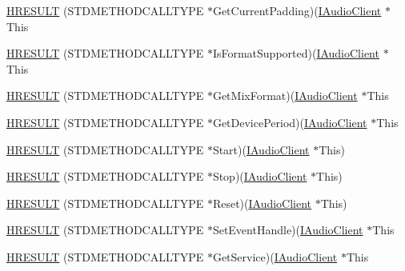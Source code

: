 \begin{DoxyCompactItemize}
\hyperlink{struct_i_audio_client_vtbl_a0fdf15db0d74b0e4052f2410f59a59ce}{H\+R\+E\+S\+U\+LT} (S\+T\+D\+M\+E\+T\+H\+O\+D\+C\+A\+L\+L\+T\+Y\+PE $\ast$Get\+Current\+Padding)(\hyperlink{audioclient_8h_ace13012ab56d9326b7aabeab5d477652}{I\+Audio\+Client} $\ast$This
\item 
\hyperlink{struct_i_audio_client_vtbl_a64bb7eb33a2fa4dbf465bf67ac32dfcc}{H\+R\+E\+S\+U\+LT} (S\+T\+D\+M\+E\+T\+H\+O\+D\+C\+A\+L\+L\+T\+Y\+PE $\ast$Is\+Format\+Supported)(\hyperlink{audioclient_8h_ace13012ab56d9326b7aabeab5d477652}{I\+Audio\+Client} $\ast$This
\item 
\hyperlink{struct_i_audio_client_vtbl_a3fd8ab344ce4ca8307297b9c62520811}{H\+R\+E\+S\+U\+LT} (S\+T\+D\+M\+E\+T\+H\+O\+D\+C\+A\+L\+L\+T\+Y\+PE $\ast$Get\+Mix\+Format)(\hyperlink{audioclient_8h_ace13012ab56d9326b7aabeab5d477652}{I\+Audio\+Client} $\ast$This
\item 
\hyperlink{struct_i_audio_client_vtbl_abda2c4fc66e4035c3e859d633f64539b}{H\+R\+E\+S\+U\+LT} (S\+T\+D\+M\+E\+T\+H\+O\+D\+C\+A\+L\+L\+T\+Y\+PE $\ast$Get\+Device\+Period)(\hyperlink{audioclient_8h_ace13012ab56d9326b7aabeab5d477652}{I\+Audio\+Client} $\ast$This
\item 
\hyperlink{struct_i_audio_client_vtbl_ac59221bf71a774f8a4e4b57df344ddc8}{H\+R\+E\+S\+U\+LT} (S\+T\+D\+M\+E\+T\+H\+O\+D\+C\+A\+L\+L\+T\+Y\+PE $\ast$Start)(\hyperlink{audioclient_8h_ace13012ab56d9326b7aabeab5d477652}{I\+Audio\+Client} $\ast$This)
\item 
\hyperlink{struct_i_audio_client_vtbl_a79f16a14c23ed5679a8aee2b38340f90}{H\+R\+E\+S\+U\+LT} (S\+T\+D\+M\+E\+T\+H\+O\+D\+C\+A\+L\+L\+T\+Y\+PE $\ast$Stop)(\hyperlink{audioclient_8h_ace13012ab56d9326b7aabeab5d477652}{I\+Audio\+Client} $\ast$This)
\item 
\hyperlink{struct_i_audio_client_vtbl_a6294637bd9317508b6efff3945036cc9}{H\+R\+E\+S\+U\+LT} (S\+T\+D\+M\+E\+T\+H\+O\+D\+C\+A\+L\+L\+T\+Y\+PE $\ast$Reset)(\hyperlink{audioclient_8h_ace13012ab56d9326b7aabeab5d477652}{I\+Audio\+Client} $\ast$This)
\item 
\hyperlink{struct_i_audio_client_vtbl_a1fa551b3e0f10a69287c85e0550fac7f}{H\+R\+E\+S\+U\+LT} (S\+T\+D\+M\+E\+T\+H\+O\+D\+C\+A\+L\+L\+T\+Y\+PE $\ast$Set\+Event\+Handle)(\hyperlink{audioclient_8h_ace13012ab56d9326b7aabeab5d477652}{I\+Audio\+Client} $\ast$This
\item 
\hyperlink{struct_i_audio_client_vtbl_ac3bb578fd7ba2949d8fea91afe446eba}{H\+R\+E\+S\+U\+LT} (S\+T\+D\+M\+E\+T\+H\+O\+D\+C\+A\+L\+L\+T\+Y\+PE $\ast$Get\+Service)(\hyperlink{audioclient_8h_ace13012ab56d9326b7aabeab5d477652}{I\+Audio\+Client} $\ast$This
\end{DoxyCompactItemize}
